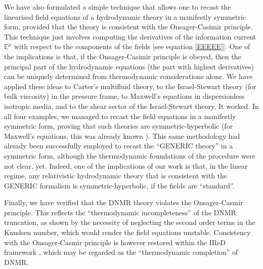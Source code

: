 \documentclass[a4paper, amsfonts, amssymb, amsmath, reprint, showkeys, nofootinbib, twoside, onecolumn,notitlepage]{revtex4-1}
\begin{document}
We have also formulated a simple technique that allows one to recast the linearised field equations of a hydrodynamic theory in a manifestly symmetric form, provided that the theory is consistent with the Onsager-Casimir principle. This technique just involves computing the derivatives of the information current $\mathbb{E}^\mu$ \cite{GavassinoCausality2021} with respect to the components of the fields [see equation \eqref{EEEEE}]. One of the implications is that, if the Onsager-Casimir principle is obeyed, then the principal part of the hydrodynamic equations (the part with highest derivatives) can be uniquely determined from thermodynamic considerations alone. We have applied these ideas to Carter's multifluid theory, to the Israel-Stewart theory (for bulk viscosity) in the pressure frame, to Maxwell's equations in dispersionless isotropic media, and to the shear sector of the Israel-Stewart theory. It worked. In all four examples, we managed to recast the field equations in a manifestly symmetric form, proving that such theories are symmetric-hyperbolic (for Maxwell's equations, this was already known \cite{Volker2011}). This same methodology had already been successfully employed to recast the ``GENERIC theory'' \cite{GavassinoGENERIC2022} in a symmetric form, although the thermodynamic foundations of the procedure were not clear, yet. Indeed, one of the implications of our work is that, in the linear regime, any relativistic hydrodynamic theory that is consistent with the GENERIC formalism is symmetric-hyperbolic, if the fields are ``standard''. 

Finally, we have verified that the DNMR theory \cite{DMNR2012} violates the Onsager-Casmir principle. This reflects the ``thermodynamic incompleteness'' of the DNMR truncation, as shown by the necessity of neglecting the second order terms in the Knudsen number, which would render the field equations unstable. Consistency with the Onsager-Casmir principle is however restored within the IReD framework \cite{Wagner2022}, which may be regarded as the ``thermodynamic completion'' of DNMR.
\end{document}
